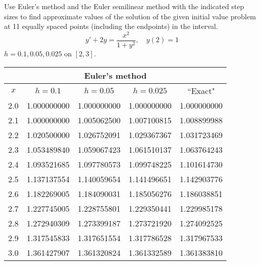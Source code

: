 \documentclass{ximera}
\begin{document}
\begin{problem}\label{exer:3.1.22} Use Euler's method and the Euler semilinear method
with the indicated  step sizes to find approximate values
of the solution of the given initial value problem at 11 equally
spaced points (including the endpoints) in the interval.
$$y'+2y=\frac{x^2}{1+y^2},\quad y(2)=1$$
 $h=0.1,0.05,0.025$ on $[2,3]$.

 

 \begin{solution}
     {\small
\begin{tabular}{|c|r|r|r|r|}
\hline
\multicolumn{5}{|c|}{Euler's method}\\\hline
\multicolumn{1}{|c|}{$x$}&
\multicolumn{1}{|c|}{$h=0.1$}&
\multicolumn{1}{|c|}{$h=0.05$}&
\multicolumn{1}{|c|}{$h=0.025$}&
\multicolumn{1}{|c|}{``Exact"}\\ \hline
2.0 & 1.000000000 & 1.000000000 & 1.000000000 & 1.000000000 \\
2.1 & 1.000000000 & 1.005062500 & 1.007100815 & 1.008899988 \\
2.2 & 1.020500000 & 1.026752091 & 1.029367367 & 1.031723469 \\
2.3 & 1.053489840 & 1.059067423 & 1.061510137 & 1.063764243 \\
2.4 & 1.093521685 & 1.097780573 & 1.099748225 & 1.101614730 \\
2.5 & 1.137137554 & 1.140059654 & 1.141496651 & 1.142903776 \\
2.6 & 1.182269005 & 1.184090031 & 1.185056276 & 1.186038851 \\
2.7 & 1.227745005 & 1.228755801 & 1.229350441 & 1.229985178 \\
2.8 & 1.272940309 & 1.273399187 & 1.273721920 & 1.274092525 \\
2.9 & 1.317545833 & 1.317651554 & 1.317786528 & 1.317967533 \\
3.0 & 1.361427907 & 1.361320824 & 1.361332589 & 1.361383810 \\
\hline
\end{tabular}}


\end{solution}
\end{problem}
\end{document}
